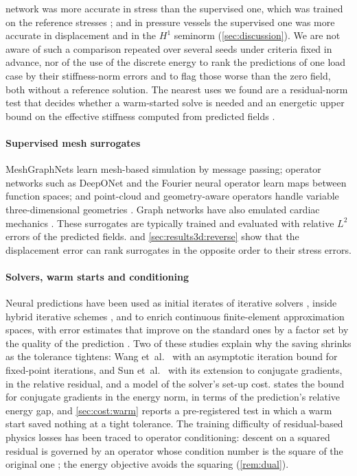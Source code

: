 network was more accurate in stress than the supervised one,
which was trained on the reference stresses \cite{MonteiroFernandes2025};
and in pressure vessels the supervised one was more accurate in displacement and in the
$H^1$ seminorm \cite{Sun2026FEVessel} (\cref{sec:discussion}). We are not aware of such a
comparison
repeated over several seeds under criteria fixed in advance, nor of the use of the discrete
energy to rank the predictions of one load case by their stiffness-norm errors and to flag
those worse than the zero field, both without a reference solution. The nearest uses we
found are a residual-norm test that
decides whether a warm-started solve is needed \cite{Wang2026PretrainFEM} and an energetic
upper bound on the effective stiffness computed from predicted fields
\cite{MonteiroFernandes2025}.

\paragraph{Supervised mesh surrogates}
MeshGraphNets \cite{Pfaff2021} learn mesh-based simulation by message passing; operator
networks such as DeepONet \cite{Lu2021DeepONet} and the Fourier neural operator
\cite{Li2021FNO} learn maps between function spaces; and point-cloud and
geometry-aware operators handle variable three-dimensional geometries
\cite{He2024GeomDeepONet,Zeng2025PCNO,Liu2026GINOT}. Graph networks have also emulated
cardiac mechanics \cite{Dalton2022}. These surrogates are typically trained and evaluated
with relative $L^2$ errors of the predicted fields.  and
\cref{sec:results3d:reverse} show that the displacement error can rank surrogates in the
opposite order to their stress errors.

\paragraph{Solvers, warm starts and conditioning}
Neural predictions have been used as initial iterates of iterative solvers
\cite{Wang2026PretrainFEM,Eshaghi2026NOWS,Sun2026FEVessel}, inside hybrid iterative schemes
\cite{Lee2025MetaSolver}, and to enrich continuous finite-element approximation spaces, with
error estimates that improve on the standard ones by a factor set by the quality of the
prediction \cite{Barucq2026Enrich}. Two of these studies explain why the saving shrinks as
the tolerance tightens: Wang et~al.~\cite{Wang2026PretrainFEM} with an asymptotic iteration
bound for fixed-point iterations, and Sun et~al.~\cite{Sun2026FEVessel} with its extension
to conjugate gradients, in the relative residual, and a model of the solver's set-up cost.
 states the bound for conjugate gradients in the energy norm, in terms of the
prediction's relative energy gap, and \cref{sec:cost:warm} reports a pre-registered test in
which a warm start saved nothing at a tight tolerance. The training difficulty of
residual-based physics losses has been traced to operator conditioning: descent on a squared
residual is governed by an operator whose condition number is the square of the original one
\cite{DeRyck2024}; the energy objective avoids the squaring (\cref{rem:dual}).

